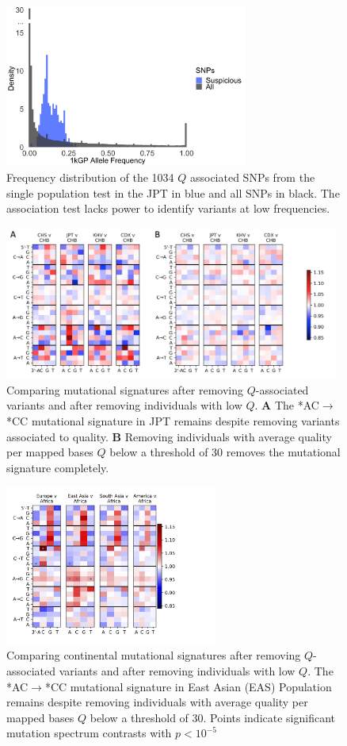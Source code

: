 \documentclass[9pt,article]{template}
\begin{document}
\begin{figure}
\centering
\includegraphics[width=8cm,keepaspectratio]{histogram_of_sig_snps.jpg}
\caption{Frequency distribution of the 1034 $Q$ associated SNPs from the single population test in the JPT in blue and all SNPs in black. The association test lacks power to identify variants at low frequencies.}  
\label{histogram_of_sig_snps}
\end{figure}

\begin{figure}[tbp]
\includegraphics[width=11cm,keepaspectratio]{MutationSpectrum_cutOff.png}
\caption{Comparing mutational signatures after removing $Q$-associated variants and after removing individuals with low $Q$.  
\textbf{A} 
The  *AC${\rightarrow}$*CC mutational signature in JPT remains despite removing variants associated to quality.
\textbf{B} 
Removing individuals with average quality per mapped bases $Q$ below a threshold of 30 removes the mutational signature completely. }
\label{MutSpect}
\end{figure}


\begin{figure}[tbp]
\includegraphics[width=7cm,keepaspectratio]{CutOffID_QUAL30_heatmap_v_AFR_nosingle.jpg}
\caption{Comparing continental mutational signatures after removing $Q$-associated variants and after removing individuals with low $Q$.  
The  *AC${\rightarrow}$*CC mutational signature in East Asian (EAS) Population remains despite removing individuals with average quality per mapped bases $Q$ below a threshold of 30.
Points indicate significant mutation spectrum contrasts with $p <10^{-5}$}
\label{MutSpect_continental}
\end{figure}
\end{document}

